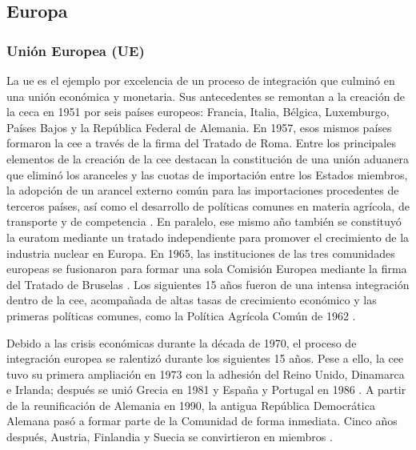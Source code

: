 \clearpage
\subsection{Europa}

\subsubsection{Unión Europea (UE)}

La \acrfull{ue} es el ejemplo por excelencia de un proceso de integración que culminó en una unión económica y monetaria. Sus antecedentes se remontan a la creación de la \gls{ceca} en 1951 por seis países europeos: Francia, Italia, Bélgica, Luxemburgo, Países Bajos y la República Federal de Alemania. En 1957, esos mismos países formaron la \gls{cee} a través de la firma del Tratado de Roma. Entre los principales elementos de la creación de la \gls{cee} destacan la constitución de una unión aduanera que eliminó los aranceles y las cuotas de importación entre los Estados miembros, la adopción de un arancel externo común para las importaciones procedentes de terceros países, así como el desarrollo de políticas comunes en materia agrícola, de transporte y de competencia \parencite[p.~180]{Leuffen2022}. En paralelo, ese mismo año también se constituyó la \gls{euratom} mediante un tratado independiente para promover el crecimiento de la industria nuclear en Europa. En 1965, las instituciones de las tres comunidades europeas se fusionaron para formar una sola Comisión Europea mediante la firma del Tratado de Bruselas \parencite[p.~563]{EuropaDirectory2022}. Los siguientes 15 años fueron de una intensa integración dentro de la \gls{cee}, acompañada de altas tasas de crecimiento económico y las primeras políticas comunes, como la Política Agrícola Común de 1962 \parencite[p.~48]{Kollarik2025}.


Debido a las crisis económicas durante la década de 1970, el proceso de integración europea se ralentizó durante los siguientes 15 años. Pese a ello, la \gls{cee} tuvo su primera ampliación en 1973 con la adhesión del Reino Unido, Dinamarca e Irlanda; después se unió Grecia en 1981 y España y Portugal en 1986 \parencite[pp.~48--49]{Kollarik2025}. A partir de la reunificación de Alemania en 1990, la antigua República Democrática Alemana pasó a formar parte de la Comunidad de forma inmediata. Cinco años después, Austria, Finlandia y Suecia se convirtieron en miembros \parencite[p.~564]{EuropaDirectory2022}.

